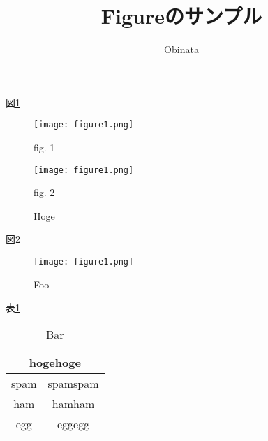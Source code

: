 \documentclass[11pt]{jarticle}
\begin{document}
\title{Figureのサンプル}
\author{Obinata}
\date{}
\maketitle

図\ref{1}
\begin{figure}[htbp]
	\begin{center}
		\begin{minipage}{0.48\hsize}
			\begin{center}
				\texttt{[image: figure1.png]}
			\end{center}
			\begin{center}
				fig. 1
			\end{center}
		\end{minipage}		
		\hfil
		\begin{minipage}{0.48\hsize}
			\begin{center}
				\texttt{[image: figure1.png]}
			\end{center}
			\begin{center}
				fig. 2 
			\end{center}
		\end{minipage}
		\caption{Hoge}
		\label{1}
	\end{center}
\end{figure}

図\ref{2}
\begin{figure}[H]
	\begin{center}
		\texttt{[image: figure1.png]}
		\vspace{-0.5cm}
		\caption{Foo}
		\label{2}
	\end{center}
\end{figure}

表\ref{3}
\begin{table}[htbp]
	\centering
	\caption{Bar}
	\label{3}
	\begin{tabular}{|c|c|} \hline
			\multicolumn{2}{|c|}{hogehoge}\\ \hline
		spam & spamspam \\ \hline
		ham & hamham \\ \hline
		egg & eggegg \\ \hline
	\end{tabular}
\end{table}
\end{document}
